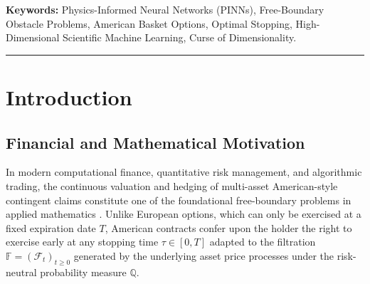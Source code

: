 \documentclass[11pt,a4paper]{article}
\begin{document}
\noindent\textbf{Keywords:} Physics-Informed Neural Networks (PINNs), Free-Boundary Obstacle Problems, American Basket Options, Optimal Stopping, High-Dimensional Scientific Machine Learning, Curse of Dimensionality.

\vspace{1em}
\hrule
\vspace{1em}

\section{Introduction}

\subsection{Financial and Mathematical Motivation}
In modern computational finance, quantitative risk management, and algorithmic trading, the continuous valuation and hedging of multi-asset American-style contingent claims constitute one of the foundational free-boundary problems in applied mathematics \cite{merton1973theory, brennan1977valuation}. Unlike European options, which can only be exercised at a fixed expiration date $T$, American contracts confer upon the holder the right to exercise early at any stopping time $\tau \in [0, T]$ adapted to the filtration $\mathbb{F} = (\mathcal{F}_t)_{t \ge 0}$ generated by the underlying asset price processes under the risk-neutral probability measure $\mathbb{Q}$.
\end{document}

